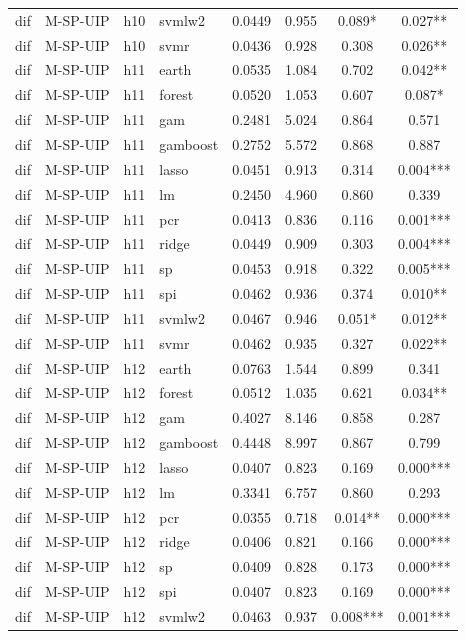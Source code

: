 \begin{ThreePartTable}
\begin{longtable}[t]{llclcccc}
dif & M-SP-UIP & h10 & svmlw2 & 0.0449 & 0.955 & 0.089* & 0.027**\\
dif & M-SP-UIP & h10 & svmr & 0.0436 & 0.928 & 0.308 & 0.026**\\
\addlinespace
dif & M-SP-UIP & h11 & earth & 0.0535 & 1.084 & 0.702 & 0.042**\\
dif & M-SP-UIP & h11 & forest & 0.0520 & 1.053 & 0.607 & 0.087*\\
dif & M-SP-UIP & h11 & gam & 0.2481 & 5.024 & 0.864 & 0.571\\
dif & M-SP-UIP & h11 & gamboost & 0.2752 & 5.572 & 0.868 & 0.887\\
dif & M-SP-UIP & h11 & lasso & 0.0451 & 0.913 & 0.314 & 0.004***\\
dif & M-SP-UIP & h11 & lm & 0.2450 & 4.960 & 0.860 & 0.339\\
dif & M-SP-UIP & h11 & pcr & 0.0413 & 0.836 & 0.116 & 0.001***\\
dif & M-SP-UIP & h11 & ridge & 0.0449 & 0.909 & 0.303 & 0.004***\\
dif & M-SP-UIP & h11 & sp & 0.0453 & 0.918 & 0.322 & 0.005***\\
dif & M-SP-UIP & h11 & spi & 0.0462 & 0.936 & 0.374 & 0.010**\\
dif & M-SP-UIP & h11 & svmlw2 & 0.0467 & 0.946 & 0.051* & 0.012**\\
dif & M-SP-UIP & h11 & svmr & 0.0462 & 0.935 & 0.327 & 0.022**\\
\addlinespace
dif & M-SP-UIP & h12 & earth & 0.0763 & 1.544 & 0.899 & 0.341\\
dif & M-SP-UIP & h12 & forest & 0.0512 & 1.035 & 0.621 & 0.034**\\
dif & M-SP-UIP & h12 & gam & 0.4027 & 8.146 & 0.858 & 0.287\\
dif & M-SP-UIP & h12 & gamboost & 0.4448 & 8.997 & 0.867 & 0.799\\
dif & M-SP-UIP & h12 & lasso & 0.0407 & 0.823 & 0.169 & 0.000***\\
dif & M-SP-UIP & h12 & lm & 0.3341 & 6.757 & 0.860 & 0.293\\
dif & M-SP-UIP & h12 & pcr & 0.0355 & 0.718 & 0.014** & 0.000***\\
dif & M-SP-UIP & h12 & ridge & 0.0406 & 0.821 & 0.166 & 0.000***\\
dif & M-SP-UIP & h12 & sp & 0.0409 & 0.828 & 0.173 & 0.000***\\
dif & M-SP-UIP & h12 & spi & 0.0407 & 0.823 & 0.169 & 0.000***\\
dif & M-SP-UIP & h12 & svmlw2 & 0.0463 & 0.937 & 0.008*** & 0.001***\\

\end{longtable}
\end{ThreePartTable}
